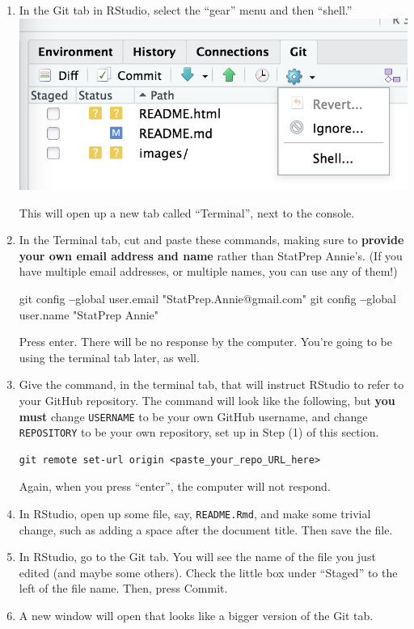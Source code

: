 \documentclass[]{book}
\newenvironment{Shaded}{\begin{snugshade}}{\end{snugshade}}
\newcommand{\StringTok}[1]{\textcolor[rgb]{0.31,0.60,0.02}{#1}}
\newcommand{\OperatorTok}[1]{\textcolor[rgb]{0.81,0.36,0.00}{\textbf{#1}}}
\newcommand{\NormalTok}[1]{#1}
\theoremstyle{definition}
\theoremstyle{definition}
\theoremstyle{definition}
\theoremstyle{remark}
\begin{document}
\begin{enumerate}
\def\labelenumi{\arabic{enumi}.}
\item
  In the Git tab in RStudio, select the ``gear'' menu and then
  ``shell.'' \includegraphics{images/new_repo4.png}

  This will open up a new tab called ``Terminal'', next to the console.
\item
  In the Terminal tab, cut and paste these commands, making sure to
  \textbf{provide your own email address and name} rather than StatPrep
  Annie's. (If you have multiple email addresses, or multiple names, you
  can use any of them!)

\begin{Shaded}
\begin{Highlighting}[]
\NormalTok{git config }\OperatorTok{--}\NormalTok{global user.email }\StringTok{"StatPrep.Annie@gmail.com"}
\NormalTok{git config }\OperatorTok{--}\NormalTok{global user.name }\StringTok{"StatPrep Annie"}
\end{Highlighting}
\end{Shaded}

  Press enter. There will be no response by the computer. You're going
  to be using the terminal tab later, as well.
\item
  Give the command, in the terminal tab, that will instruct RStudio to
  refer to your GitHub repository. The command will look like the
  following, but \textbf{you must} change \texttt{USERNAME} to be your
  own GitHub username, and change \texttt{REPOSITORY} to be your own
  repository, set up in Step (1) of this section.

\begin{verbatim}
git remote set-url origin <paste_your_repo_URL_here>
\end{verbatim}

  Again, when you press ``enter'', the computer will not respond.
\item
  In RStudio, open up some file, say, \texttt{README.Rmd}, and make some
  trivial change, such as adding a space after the document title. Then
  save the file.
\item
  In RStudio, go to the Git tab. You will see the name of the file you
  just edited (and maybe some others). Check the little box under
  ``Staged'' to the left of the file name. Then, press Commit.
\item
  A new window will open that looks like a bigger version of the Git
  tab.


\end{enumerate}
\end{document}
